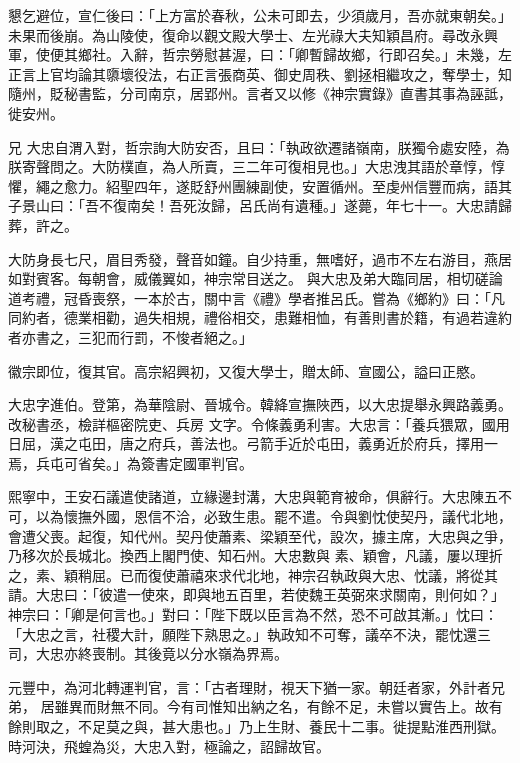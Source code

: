 \begin{pinyinscope}
 懇乞避位，宣仁後曰：「上方富於春秋，公未可即去，少須歲月，吾亦就東朝矣。」未果而後崩。為山陵使，復命以觀文殿大學士、左光祿大夫知穎昌府。尋改永興軍，使便其鄉社。入辭，哲宗勞慰甚渥，曰：「卿暫歸故鄉，行即召矣。」未幾，左正言上官均論其隳壞役法，右正言張商英、御史周秩、劉拯相繼攻之，奪學士，知隨州，貶秘書監，分司南京，居郢州。言者又以修《神宗實錄》直書其事為誣詆，徙安州。



 兄
 大忠自渭入對，哲宗詢大防安否，且曰：「執政欲遷諸嶺南，朕獨令處安陸，為朕寄聲問之。大防樸直，為人所賣，三二年可復相見也。」大忠洩其語於章惇，惇懼，繩之愈力。紹聖四年，遂貶舒州團練副使，安置循州。至虔州信豐而病，語其子景山曰：「吾不復南矣！吾死汝歸，呂氏尚有遺種。」遂薨，年七十一。大忠請歸葬，許之。



 大防身長七尺，眉目秀發，聲音如鐘。自少持重，無嗜好，過市不左右游目，燕居如對賓客。每朝會，威儀翼如，神宗常目送之。
 與大忠及弟大臨同居，相切磋論道考禮，冠昏喪祭，一本於古，關中言《禮》學者推呂氏。嘗為《鄉約》曰：「凡同約者，德業相勸，過失相規，禮俗相交，患難相恤，有善則書於籍，有過若違約者亦書之，三犯而行罰，不悛者絕之。」



 徽宗即位，復其官。高宗紹興初，又復大學士，贈太師、宣國公，謚曰正愍。



 大忠字進伯。登第，為華陰尉、晉城令。韓絳宣撫陜西，以大忠提舉永興路義勇。改秘書丞，檢詳樞密院吏、兵房
 文字。令條義勇利害。大忠言：「養兵猥眾，國用日屈，漢之屯田，唐之府兵，善法也。弓箭手近於屯田，義勇近於府兵，擇用一焉，兵屯可省矣。」為簽書定國軍判官。



 熙寧中，王安石議遣使諸道，立緣邊封溝，大忠與範育被命，俱辭行。大忠陳五不可，以為懷撫外國，恩信不洽，必致生患。罷不遣。令與劉忱使契丹，議代北地，會遭父喪。起復，知代州。契丹使蕭素、梁穎至代，設次，據主席，大忠與之爭，乃移次於長城北。換西上閣門使、知石州。大忠數與
 素、穎會，凡議，屢以理折之，素、穎稍屈。已而復使蕭禧來求代北地，神宗召執政與大忠、忱議，將從其請。大忠曰：「彼遣一使來，即與地五百里，若使魏王英弼來求關南，則何如？」神宗曰：「卿是何言也。」對曰：「陛下既以臣言為不然，恐不可啟其漸。」忱曰：「大忠之言，社稷大計，願陛下熟思之。」執政知不可奪，議卒不決，罷忱還三司，大忠亦終喪制。其後竟以分水嶺為界焉。



 元豐中，為河北轉運判官，言：「古者理財，視天下猶一家。朝廷者家，外計者兄弟，
 居雖異而財無不同。今有司惟知出納之名，有餘不足，未嘗以實告上。故有餘則取之，不足莫之與，甚大患也。」乃上生財、養民十二事。徙提點淮西刑獄。時河決，飛蝗為災，大忠入對，極論之，詔歸故官。




\end{pinyinscope}
